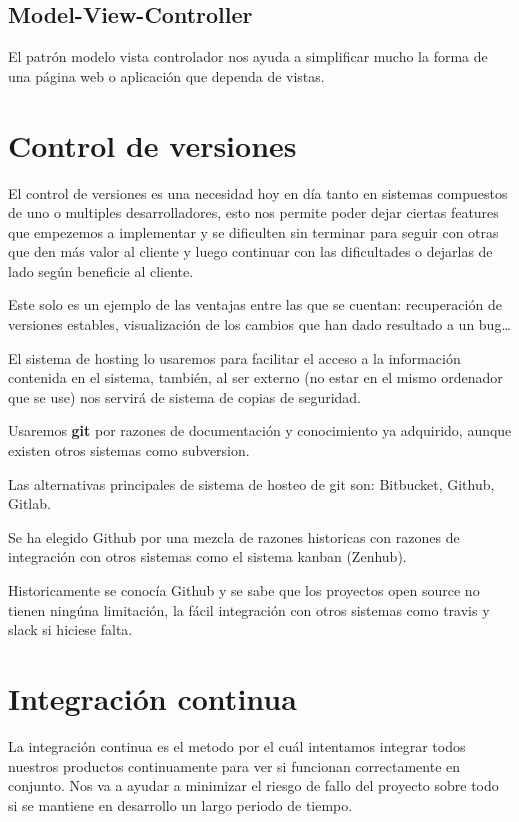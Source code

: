 \subsection{Model-View-Controller}

El patrón modelo vista controlador nos ayuda a simplificar mucho la forma de una página web o aplicación que dependa de vistas. 


\section{Control de versiones}

El control de versiones es una necesidad hoy en día tanto en sistemas compuestos de uno o multiples desarrolladores, esto nos permite poder dejar ciertas features que empezemos a implementar y se dificulten sin terminar para seguir con otras que den más valor al cliente y luego continuar con las dificultades o dejarlas de lado según beneficie al cliente.

Este solo es un ejemplo de las ventajas entre las que se cuentan: recuperación de versiones estables, visualización de los cambios que han dado resultado a un bug\ldots

El sistema de hosting lo usaremos para facilitar el acceso a la información contenida en el sistema, también, al ser externo (no estar en el mismo ordenador que se use) nos servirá de sistema de copias de seguridad.

Usaremos \textbf{git} por razones de documentación y conocimiento ya adquirido, aunque existen otros sistemas como subversion.

Las alternativas principales de sistema de hosteo de git son: Bitbucket, Github, Gitlab.

Se ha elegido Github por una mezcla de razones historicas con razones de integración con otros sistemas como el sistema kanban (Zenhub).

Historicamente se conocía Github y se sabe que los proyectos open source no tienen ningúna limitación, la fácil integración con otros sistemas como travis y slack si hiciese falta.


\section{Integración continua}

La integración continua es el metodo por el cuál intentamos integrar todos nuestros productos continuamente para ver si funcionan correctamente en conjunto. Nos va a ayudar a minimizar el riesgo de fallo del proyecto sobre todo si se mantiene en desarrollo un largo periodo de tiempo.

